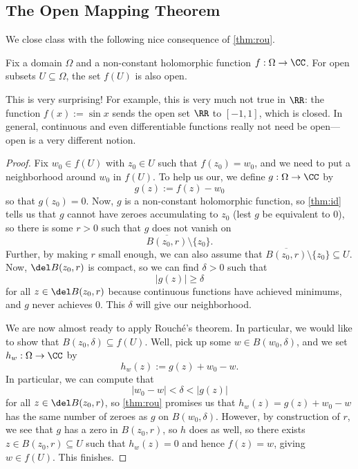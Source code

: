 \subsection{The Open Mapping Theorem}
We close class with the following nice consequence of \autoref{thm:rou}.
\begin{theorem}
	Fix a domain $\Omega$ and a non-constant holomorphic function $f:\Omega\to\CC$. For open subsets $U\subseteq\Omega$, the set $f(U)$ is also open.
\end{theorem}
This is very surprising! For example, this is very much not true in $\RR$: the function $f(x):=\sin x$ sends the open set $\RR$ to $[-1,1]$, which is closed. In general, continuous and even differentiable functions really not need be open---open is a very different notion.
\begin{proof}
	Fix $w_0\in f(U)$ with $z_0\in U$ such that $f(z_0)=w_0$, and we need to put a neighborhood around $w_0$ in $f(U)$. To help us our, we define $g:\Omega\to\CC$ by
	\[g(z):=f(z)-w_0\]
	so that $g(z_0)=0$. Now, $g$ is a non-constant holomorphic function, so \autoref{thm:id} tells us that $g$ cannot have zeroes accumulating to $z_0$ (lest $g$ be equivalent to $0$), so there is some $r>0$ such that $g$ does not vanish on
	\[\overline{B(z_0,r)}\setminus\{z_0\}.\]
	Further, by making $r$ small enough, we can also assume that $\overline{B(z_0,r)}\setminus\{z_0\}\subseteq U$. Now, $\del B(z_0,r)$ is compact, so we can find $\delta>0$ such that
	\[|g(z)|\ge\delta\]
	for all $z\in\del B(z_0,r)$ because continuous functions have achieved minimums, and $g$ never achieves $0$. This $\delta$ will give our neighborhood.

	We are now almost ready to apply Rouch\'e's theorem. In particular, we would like to show that $B(z_0,\delta)\subseteq f(U)$. Well, pick up some $w\in B(w_0,\delta)$, and we set $h_w:\Omega\to\CC$ by
	\[h_w(z):=g(z)+w_0-w.\]
	In particular, we can compute that
	\[|w_0-w|<\delta<|g(z)|\]
	for all $z\in\del B(z_0,r)$, so \autoref{thm:rou} promises us that $h_w(z)=g(z)+w_0-w$ has the same number of zeroes as $g$ on $B(w_0,\delta)$. However, by construction of $r$, we see that $g$ has a zero in $B(z_0,r)$, so $h$ does as well, so there exists $z\in B(z_0,r)\subseteq U$ such that $h_w(z)=0$ and hence $f(z)=w$, giving $w\in f(U)$. This finishes.
\end{proof}